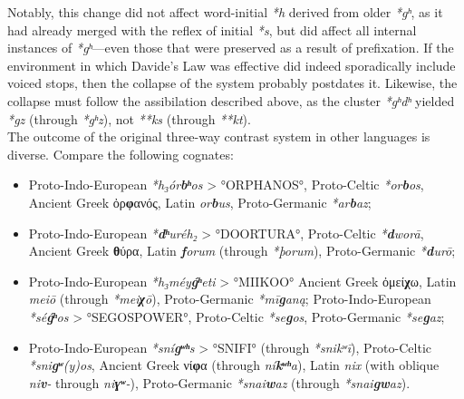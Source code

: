 \documentclass[svgnames,x11names,b5paper]{book}
\begin{document}
            Notably, this change did not affect word-initial \textit{*h} derived from older \textit{*gʰ}, as it had already merged with the reflex of initial \textit{*s}, but did affect all internal instances of \textit{*gʰ}—even those that were preserved as a result of prefixation. If the environment in which Davide's Law was effective did indeed sporadically include voiced stops, then the collapse of the system probably postdates it. Likewise, the collapse must follow the assibilation described above, as the cluster \textit{*gʰdʰ} yielded \textit{*gz} (through \textit{*gʰz}), not \textit{**ks} (through \textit{**kt}).\\
The outcome of the original three-way contrast system in other languages is diverse. Compare the following cognates:
\begin{itemize}
\item  Proto-Indo-European \textit{*h₃ór\textbf{bʰ}os} > °ORPHANOS°, Proto-Celtic \textit{*or\textbf{b}os}, Ancient Greek ὀρ\textbf{φ}ανός, Latin \textit{or\textbf{b}us}, Proto-Germanic \textit{*ar\textbf{b}az};\\
\item  Proto-Indo-European \textit{*\textbf{dʰ}uréh₂} > °DOORTURA°, Proto-Celtic \textit{*\textbf{d}worā}, Ancient Greek \textbf{θ}ύρα, Latin \textit{\textbf{f}orum} (through \textit{*þorum}), Proto-Germanic \textit{*\textbf{d}urō};\\
\item  Proto-Indo-European \textit{*h₃méy\textbf{ǵʰ}eti} > °MIIKOO° Ancient Greek ὀμεί\textbf{χ}ω, Latin \textit{meiō} (through \textit{*mei\textbf{χ}ō}), Proto-Germanic \textit{*mī\textbf{g}aną}; Proto-Indo-European \textit{*sé\textbf{ǵʰ}os} > °SEGOSPOWER°, Proto-Celtic \textit{*se\textbf{g}os}, Proto-Germanic \textit{*se\textbf{g}az};\\
\item  Proto-Indo-European \textit{*sní\textbf{gʷʰ}s} > °SNIFI° (through \textit{*snikʷī}), Proto-Celtic \textit{*sni\textbf{gʷ}(y)os}, Ancient Greek νί\textbf{φ}α (through \textit{ní\textbf{kʷʰ}a}), Latin \textit{nix} (with oblique \textit{ni\textbf{v}-} through \textit{ni\textbf{ɣʷ}-}), Proto-Germanic \textit{*snai\textbf{w}az} (through \textit{*snai\textbf{gw}az}).\\
\end{itemize}
\end{document}

